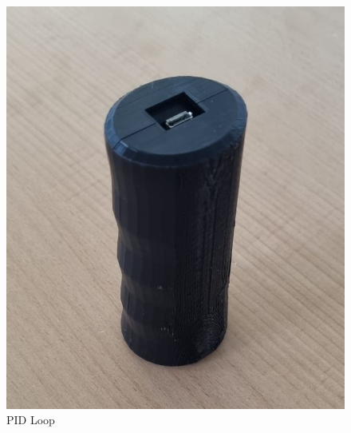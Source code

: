   \begin{figure}[H]
    \begin{center}
      \includegraphics[width=1\linewidth]{content/images/3DPrint_closed.jpeg}
      \caption{PID Loop}
    \end{center}
  \end{figure}
